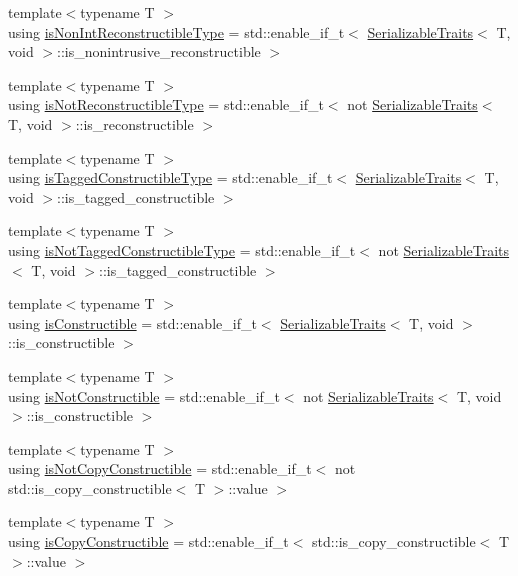 \begin{DoxyCompactItemize}
\item 
{\footnotesize template$<$typename T $>$ }\\using \hyperlink{namespacecheckpoint_a46b7909fb0fef92b4787567fde7c760b}{is\+Non\+Int\+Reconstructible\+Type} = std\+::enable\+\_\+if\+\_\+t$<$ \hyperlink{structcheckpoint_1_1_serializable_traits}{Serializable\+Traits}$<$ T, void $>$\+::is\+\_\+nonintrusive\+\_\+reconstructible $>$
\item 
{\footnotesize template$<$typename T $>$ }\\using \hyperlink{namespacecheckpoint_a0054cbef71b90d6860e1d3916cf9d299}{is\+Not\+Reconstructible\+Type} = std\+::enable\+\_\+if\+\_\+t$<$ not \hyperlink{structcheckpoint_1_1_serializable_traits}{Serializable\+Traits}$<$ T, void $>$\+::is\+\_\+reconstructible $>$
\item 
{\footnotesize template$<$typename T $>$ }\\using \hyperlink{namespacecheckpoint_abff0f367c546c94ce857d200153d990f}{is\+Tagged\+Constructible\+Type} = std\+::enable\+\_\+if\+\_\+t$<$ \hyperlink{structcheckpoint_1_1_serializable_traits}{Serializable\+Traits}$<$ T, void $>$\+::is\+\_\+tagged\+\_\+constructible $>$
\item 
{\footnotesize template$<$typename T $>$ }\\using \hyperlink{namespacecheckpoint_a4eb64ee16bff7ef1609e5b98cb16cfb6}{is\+Not\+Tagged\+Constructible\+Type} = std\+::enable\+\_\+if\+\_\+t$<$ not \hyperlink{structcheckpoint_1_1_serializable_traits}{Serializable\+Traits}$<$ T, void $>$\+::is\+\_\+tagged\+\_\+constructible $>$
\item 
{\footnotesize template$<$typename T $>$ }\\using \hyperlink{namespacecheckpoint_a48ec2649d5cbd890f67ea1193cc0d51a}{is\+Constructible} = std\+::enable\+\_\+if\+\_\+t$<$ \hyperlink{structcheckpoint_1_1_serializable_traits}{Serializable\+Traits}$<$ T, void $>$\+::is\+\_\+constructible $>$
\item 
{\footnotesize template$<$typename T $>$ }\\using \hyperlink{namespacecheckpoint_a14b3c81988a2c2d3c935edcc653b6322}{is\+Not\+Constructible} = std\+::enable\+\_\+if\+\_\+t$<$ not \hyperlink{structcheckpoint_1_1_serializable_traits}{Serializable\+Traits}$<$ T, void $>$\+::is\+\_\+constructible $>$
\item 
{\footnotesize template$<$typename T $>$ }\\using \hyperlink{namespacecheckpoint_a141a100f9dcca06fb0b6dbf44a5d6756}{is\+Not\+Copy\+Constructible} = std\+::enable\+\_\+if\+\_\+t$<$ not std\+::is\+\_\+copy\+\_\+constructible$<$ T $>$\+::value $>$
\item 
{\footnotesize template$<$typename T $>$ }\\using \hyperlink{namespacecheckpoint_a60a9850fa59d4b236b2f888baf135a95}{is\+Copy\+Constructible} = std\+::enable\+\_\+if\+\_\+t$<$ std\+::is\+\_\+copy\+\_\+constructible$<$ T $>$\+::value $>$
\end{DoxyCompactItemize}
